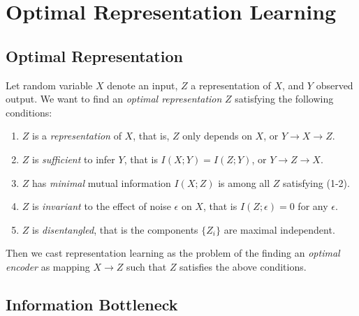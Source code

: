 \documentclass[11pt]{article}
\begin{document}
\section{Optimal Representation Learning}

\subsection*{Optimal Representation}
Let random variable $X$ denote an input, $Z$ a representation of $X$, and $Y$ observed output. We want to find an \emph{optimal representation} $Z$ satisfying the following conditions:

\begin{enumerate}
	\item $Z$ is a \emph{representation} of $X$, that is, $Z$ only depends on $X$, or $Y\rightarrow X \rightarrow Z$.
	\item $Z$ is \emph{sufficient} to infer $Y$, that is $I(X;Y) = I(Z;Y)$, or $Y\rightarrow Z \rightarrow X$.
	\item $Z$ has \emph{minimal} mutual information $I(X;Z)$ is among all $Z$ satisfying (1-2).
	\item $Z$ is \emph{invariant} to the effect of noise $\epsilon$ on $X$, that is $I(Z;\epsilon)=0$ for any $\epsilon$.
	\item $Z$ is \emph{disentangled}, that is the components $\{Z_i\}$ are maximal independent.
\end{enumerate}

Then we cast representation learning as the problem of the finding an \emph{optimal encoder} as mapping $X\rightarrow Z$ such that $Z$ satisfies the above conditions.

\subsection*{Information Bottleneck}
\end{document}
